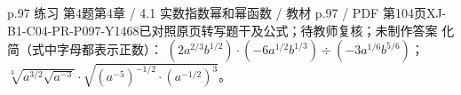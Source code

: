 \par\noindent\begin{minipage}{\linewidth}
\begin{bankitem}{p.97 练习 第4题}{第4章 / 4.1 实数指数幂和幂函数 / 教材 p.97 / PDF 第104页}{XJ-B1-C04-PR-P097-Y1468}{已对照原页转写题干及公式；待教师复核；未制作答案}
化简（式中字母都表示正数）：
$\left(2a^{2/3}b^{1/2}\right)\cdot\left(-6a^{1/2}b^{1/3}\right)\div\left(-3a^{1/6}b^{5/6}\right)$；
$\sqrt[3]{a^{3/2}\sqrt{a^{-3}}}\cdot\sqrt{(a^{-5})^{-1/2}\cdot(a^{-1/2})^3}$。
\end{bankitem}
\end{minipage}\par\medskip
